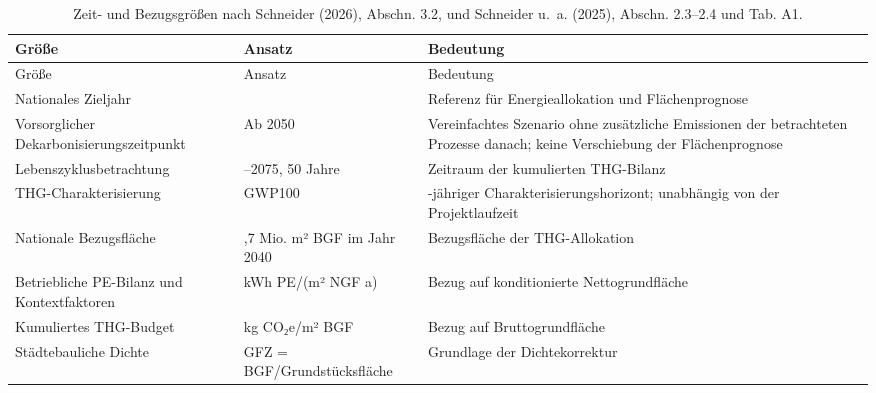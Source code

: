 \documentclass[
  ngerman,
  a4paper,
  DIV=11]{scrreprt}
\begin{document}
\begin{longtable}[]{@{}
  >{\raggedright\arraybackslash}p{}
  >{\raggedright\arraybackslash}p{}
  >{\raggedright\arraybackslash}p{}@{}}
\caption{Zeit- und Bezugsgrößen nach Schneider (2026), Abschn. 3.2, und
Schneider u.~a. (2025), Abschn. 2.3--2.4 und Tab. A1.}\tabularnewline
\toprule\noalign{}
\begin{minipage}[b]{\linewidth}\raggedright
Größe
\end{minipage} & \begin{minipage}[b]{\linewidth}\raggedright
Ansatz
\end{minipage} & \begin{minipage}[b]{\linewidth}\raggedright
Bedeutung
\end{minipage} \\
\midrule\noalign{}
\endfirsthead
\toprule\noalign{}
\begin{minipage}[b]{\linewidth}\raggedright
Größe
\end{minipage} & \begin{minipage}[b]{\linewidth}\raggedright
Ansatz
\end{minipage} & \begin{minipage}[b]{\linewidth}\raggedright
Bedeutung
\end{minipage} \\
\midrule\noalign{}
\endhead
\bottomrule\noalign{}
\endlastfoot
Nationales Zieljahr & 2040 & Referenz für Energieallokation und
Flächenprognose \\
Vorsorglicher Dekarbonisierungszeitpunkt & Ab 2050 & Vereinfachtes
Szenario ohne zusätzliche Emissionen der betrachteten Prozesse danach;
keine Verschiebung der Flächenprognose \\
Lebenszyklusbetrachtung & 2025--2075, 50 Jahre & Zeitraum der
kumulierten THG-Bilanz \\
THG-Charakterisierung & GWP100 & 100-jähriger
Charakterisierungshorizont; unabhängig von der Projektlaufzeit \\
Nationale Bezugsfläche & 906,7 Mio. m² BGF im Jahr 2040 & Bezugsfläche
der THG-Allokation \\
Betriebliche PE-Bilanz und Kontextfaktoren & kWh PE/(m² NGF a) & Bezug
auf konditionierte Nettogrundfläche \\
Kumuliertes THG-Budget & kg CO₂e/m² BGF & Bezug auf Bruttogrundfläche \\
Städtebauliche Dichte & GFZ = BGF/Grundstücksfläche & Grundlage der
Dichtekorrektur \\
\end{longtable}
\end{document}
